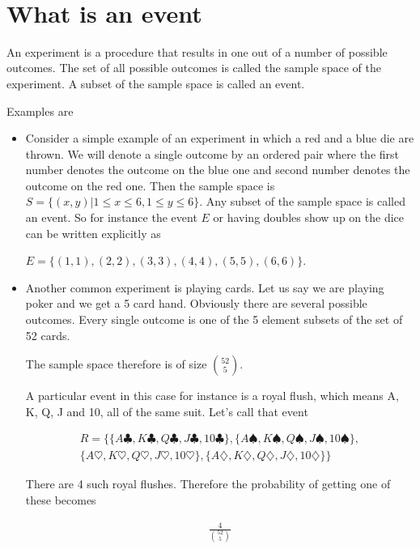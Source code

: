 \documentclass[12pt]{article}
\begin{document}
\begin{center}
\\
\vspace{1cm}
\end{center}


\medskip\noindent


\vspace{0.5cm}\noindent

\section*{What is an event}

An experiment is a procedure that results in one out of a number of possible outcomes. The set of all possible outcomes is called the sample space of the experiment. A subset of the sample space is called an event.

Examples are 

\begin{itemize}
\item Consider a simple example of an experiment in which a red and a blue die are thrown. We will denote a single outcome by an ordered pair where the first number denotes the outcome on the blue one and second number denotes the outcome on the red one.
Then the sample space is $S = \{(x,y)| 1 \le x \le 6, 1 \le y \le 6\}$.
Any subset of the sample space is called an event. So for instance the event $E$ or having doubles show up on the dice can be written explicitly as

$E = \{(1,1), (2,2), (3,3), (4,4), (5,5), (6,6)\}$.

\item Another common experiment is playing cards. Let us say we are playing poker and we get a 5 card hand. Obviously there are several possible outcomes. Every single outcome is one of the 5 element subsets of the set of 52 cards. 

The sample space therefore is of size ${52 \choose 5}$.

A particular event in this case for instance is a royal flush, which means A, K, Q, J and 10, all of the same suit. Let's call that event 

\begin{multline*}
R = \{\{A \clubsuit, K \clubsuit, Q \clubsuit, J \clubsuit, 10 \clubsuit\} , \{A \spadesuit, K \spadesuit, Q \spadesuit, J \spadesuit, 10 \spadesuit \}, \\
\{A \heartsuit, K \heartsuit, Q \heartsuit, J \heartsuit, 10 \heartsuit \} , \{ A \diamondsuit, K \diamondsuit, Q \diamondsuit, J \diamondsuit , 10 \diamondsuit \} \}
\end{multline*} 

There are 4 such royal flushes. Therefore the probability of getting one of these becomes

\begin{align*}
\frac{4}{\binom{52}{5}}
\end{align*}

\end{itemize}
\end{document}
